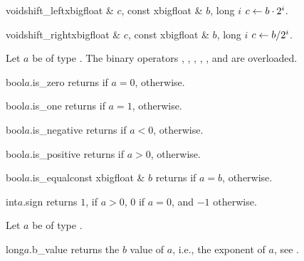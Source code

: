 \begin{fcode}{void}{shift_left}{xbigfloat & $c$, const xbigfloat & $b$, long $i$}
  $c \leftarrow b \cdot 2^i$.
\end{fcode}

\begin{fcode}{void}{shift_right}{xbigfloat & $c$, const xbigfloat & $b$, long $i$}
  $c \leftarrow b / 2^i$.
\end{fcode}



\COMP

Let $a$ be of type .  The binary operators \code{==}, \code{!=}, \code{>=},
\code{<=}, \code{>}, and \code{<} are overloaded.

\begin{cfcode}{bool}{$a$.is_zero}{}
  returns \TRUE if $a = 0$, \FALSE otherwise.
\end{cfcode}

\begin{cfcode}{bool}{$a$.is_one}{}
  returns \TRUE if $a = 1$, \FALSE otherwise.
\end{cfcode}

\begin{cfcode}{bool}{$a$.is_negative}{}
  returns \TRUE if $a < 0$, \FALSE otherwise.
\end{cfcode}

\begin{cfcode}{bool}{$a$.is_positive}{}
  returns \TRUE if $a > 0$, \FALSE otherwise.
\end{cfcode}

\begin{cfcode}{bool}{$a$.is_equal}{const xbigfloat & $b$}
  returns \TRUE if $a = b$, \FALSE otherwise.
\end{cfcode}

\begin{cfcode}{int}{$a$.sign}{}
  returns $1$, if $a > 0$, $0$ if $a = 0$, and $-1$ otherwise.
\end{cfcode}



\BASIC

Let $a$ be of type .

\begin{cfcode}{long}{$a$.b_value}{}
  returns the $b$ value of $a$, i.e., the exponent of $a$, see \cite{Buchmann/Maurer_TR:1998}.
\end{cfcode}

